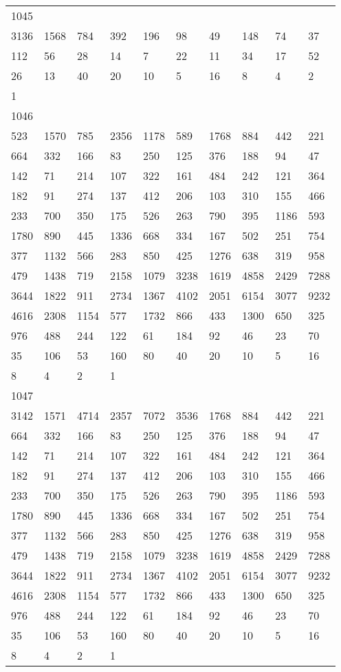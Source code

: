 \begin{longtable}{*{10}{l}}
1045&&&&&&&&&\\
3136& 1568& 784& 392& 196& 98& 49& 148& 74& 37\\
112& 56& 28& 14& 7& 22& 11& 34& 17& 52\\
26& 13& 40& 20& 10& 5& 16& 8& 4& 2\\
1& \\

1046&&&&&&&&&\\
523& 1570& 785& 2356& 1178& 589& 1768& 884& 442& 221\\
664& 332& 166& 83& 250& 125& 376& 188& 94& 47\\
142& 71& 214& 107& 322& 161& 484& 242& 121& 364\\
182& 91& 274& 137& 412& 206& 103& 310& 155& 466\\
233& 700& 350& 175& 526& 263& 790& 395& 1186& 593\\
1780& 890& 445& 1336& 668& 334& 167& 502& 251& 754\\
377& 1132& 566& 283& 850& 425& 1276& 638& 319& 958\\
479& 1438& 719& 2158& 1079& 3238& 1619& 4858& 2429& 7288\\
3644& 1822& 911& 2734& 1367& 4102& 2051& 6154& 3077& 9232\\
4616& 2308& 1154& 577& 1732& 866& 433& 1300& 650& 325\\
976& 488& 244& 122& 61& 184& 92& 46& 23& 70\\
35& 106& 53& 160& 80& 40& 20& 10& 5& 16\\
8& 4& 2& 1& \\

1047&&&&&&&&&\\
3142& 1571& 4714& 2357& 7072& 3536& 1768& 884& 442& 221\\
664& 332& 166& 83& 250& 125& 376& 188& 94& 47\\
142& 71& 214& 107& 322& 161& 484& 242& 121& 364\\
182& 91& 274& 137& 412& 206& 103& 310& 155& 466\\
233& 700& 350& 175& 526& 263& 790& 395& 1186& 593\\
1780& 890& 445& 1336& 668& 334& 167& 502& 251& 754\\
377& 1132& 566& 283& 850& 425& 1276& 638& 319& 958\\
479& 1438& 719& 2158& 1079& 3238& 1619& 4858& 2429& 7288\\
3644& 1822& 911& 2734& 1367& 4102& 2051& 6154& 3077& 9232\\
4616& 2308& 1154& 577& 1732& 866& 433& 1300& 650& 325\\
976& 488& 244& 122& 61& 184& 92& 46& 23& 70\\
35& 106& 53& 160& 80& 40& 20& 10& 5& 16\\
8& 4& 2& 1& \\


\end{longtable}

